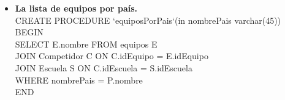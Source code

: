 \begin{itemize}
\item{\textbf{La lista de equipos por país.}\\
CREATE PROCEDURE `equiposPorPais`(in nombrePais varchar(45))\\
BEGIN\\
SELECT E.nombre FROM equipos E\\
	JOIN Competidor C ON C.idEquipo = E.idEquipo\\
	JOIN Escuela S ON C.idEscuela = S.idEscuela\\
	WHERE nombrePais = P.nombre\\
END\\
}
\end{itemize}